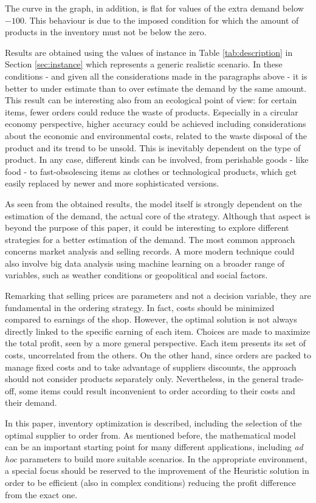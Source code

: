 \documentclass{article}
\begin{document}
The curve in the graph, in addition, is flat for values of the extra demand below $-100$. This behaviour is due to the imposed condition for which the amount of products in the inventory must not be below the zero. \par 
Results are obtained using the values of instance in Table \ref{tab:description} in Section \ref{sec:instance} which represents a generic realistic scenario. In these conditions - and given all the considerations made in the paragraphs above - it is better to under estimate than to over estimate the demand by the same amount. This result can be interesting also from an ecological point of view: for certain items, fewer orders could reduce the waste of products. Especially in a circular economy perspective, higher accuracy could be achieved including considerations about the economic and environmental costs, related to the waste disposal of the product and its trend to be unsold. 
\newpage This is inevitably dependent on the type of product. In any case, different kinds can be involved, from perishable goods - like food - to fast-obsolescing items as clothes or technological products, which get easily replaced by newer and more sophisticated versions. 
 \par
As seen from the obtained results, the model itself is strongly dependent on the estimation of the demand, the actual core of the strategy. Although that aspect is beyond the purpose of this paper, it could be interesting to explore different strategies for a better estimation of the demand. The most common approach concerns market analysis and selling records. A more modern technique could also involve big data analysis using machine learning on a broader range of variables, such as weather conditions or geopolitical and social factors. 
\par
Remarking that selling prices are parameters and not a decision variable, they are fundamental in the ordering strategy. In fact, costs should be minimized compared to earnings of the shop. However, the optimal solution is not always directly linked to the specific earning of each item. Choices are made to maximize the total profit, seen by a more general perspective. Each item presents its set of costs, uncorrelated from the others. On the other hand, since orders are packed to manage fixed costs and to take advantage of suppliers discounts, the approach should not consider products separately only. Nevertheless, in the general trade-off, some items could result inconvenient to order according to their costs and their demand.
\par

In this paper, inventory optimization is described, including the selection of the optimal supplier to order from. As mentioned before, the mathematical model can be an important starting point for many different applications, including \textit{ad hoc} parameters to build more suitable scenarios. In the appropriate environment, a special focus should be reserved to the improvement of the Heuristic solution in order to be efficient (also in complex conditions) reducing the profit difference from the exact one.
\newpage


\end{document}
